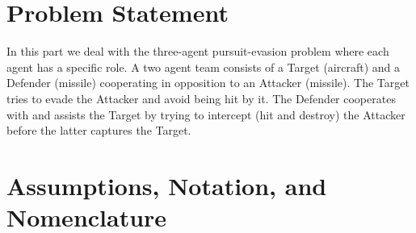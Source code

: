 \label{ATD_problem}

\section{Problem Statement}
In this part we deal with the three-agent pursuit-evasion problem where each agent has a specific role. A two agent team consists of a Target (aircraft) and a Defender (missile) cooperating in opposition to an Attacker (missile). The Target tries to evade the Attacker and avoid being hit by it. The Defender cooperates with and assists the Target by trying to intercept (hit and destroy) the Attacker before the latter captures the Target.


\section{Assumptions, Notation, and Nomenclature}
